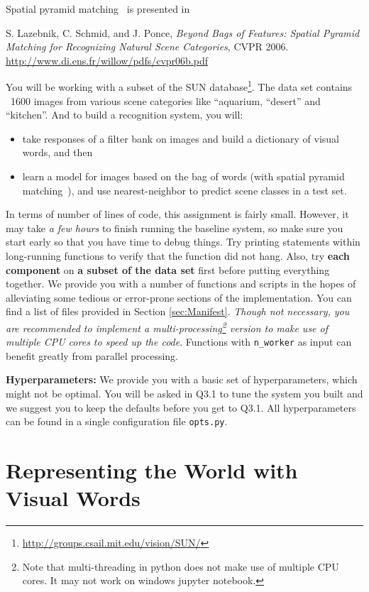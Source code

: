 \documentclass[11pt]{article}
\numberwithin{equation}{section} %
\numberwithin{figure}{section} %
\numberwithin{table}{section} %
\begin{document}
Spatial pyramid matching~\cite{1641019} is presented in
\begin{center}\parbox{5in}{
S. Lazebnik, C. Schmid, and J. Ponce, {\it Beyond Bags of Features: Spatial Pyramid Matching for Recognizing Natural Scene Categories}, CVPR 2006. \url{http://www.di.ens.fr/willow/pdfs/cvpr06b.pdf}
}
\end{center}
You will be working with a subset of the SUN database\footnote{\url{http://groups.csail.mit.edu/vision/SUN/}}. The data set contains ~1600 images from various scene categories like ``aquarium, ``desert'' and ``kitchen''. And to build a recognition system, you will:
\begin{itemize}
	\item take responses of a filter bank on images and build a dictionary of visual words, and then  
	\item learn a model for images based on the bag of words (with spatial pyramid matching~\cite{1641019}), and use nearest-neighbor to predict scene classes in a test set.
\end{itemize}

In terms of number of lines of code, this assignment is fairly small. However, it may take {\it a few hours} to finish running the baseline system, so make sure you start early so that you have time to debug things. Try printing statements within long-running functions to verify that the function did not hang. Also, try {\bf each component} on {\bf a subset of the data set} first before putting everything together. We provide you with a number of functions and scripts in the hopes of alleviating some tedious or error-prone sections of the implementation. You can find a list of files provided in Section \ref{sec:Manifest}. {\em Though not necessary, you are recommended to implement a multi-processing\footnote{Note that multi-threading in python does not make use of multiple CPU cores. It may not work on windows jupyter notebook.} version to make use of multiple CPU cores to speed up the code}. Functions with {\tt n\_worker} as input can benefit greatly from parallel processing.

{\bf Hyperparameters:} We provide you with a basic set of hyperparameters, which might not be optimal. You will be asked in Q3.1 to tune the system you built and we suggest you to keep the defaults before you get to Q3.1. 
All hyperparameters can be found in a single configuration file {\tt opts.py}.

\clearpage

\section{Representing the World with Visual Words}
\label{sec:visual_words}
\end{document}
